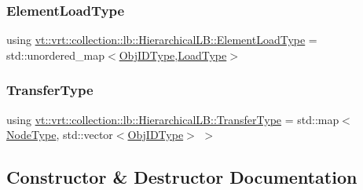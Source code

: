 \subsubsection{\texorpdfstring{Element\+Load\+Type}{ElementLoadType}}
{\footnotesize\ttfamily using \hyperlink{structvt_1_1vrt_1_1collection_1_1lb_1_1_hierarchical_l_b_a6ef136674a2f2709b91ebaade73eff68}{vt\+::vrt\+::collection\+::lb\+::\+Hierarchical\+L\+B\+::\+Element\+Load\+Type} =  std\+::unordered\+\_\+map$<$\hyperlink{structvt_1_1vrt_1_1collection_1_1lb_1_1_base_l_b_a790b22acf448880599724749cdc4e9b3}{Obj\+I\+D\+Type},\hyperlink{namespacevt_a8fb51741340b87d7aaee0bef60e9896b}{Load\+Type}$>$}

\mbox{\label{structvt_1_1vrt_1_1collection_1_1lb_1_1_hierarchical_l_b_a83550b541c35c8a1cc0c97779d1c8184}} 
\subsubsection{\texorpdfstring{Transfer\+Type}{TransferType}}
{\footnotesize\ttfamily using \hyperlink{structvt_1_1vrt_1_1collection_1_1lb_1_1_hierarchical_l_b_a83550b541c35c8a1cc0c97779d1c8184}{vt\+::vrt\+::collection\+::lb\+::\+Hierarchical\+L\+B\+::\+Transfer\+Type} =  std\+::map$<$\hyperlink{namespacevt_a866da9d0efc19c0a1ce79e9e492f47e2}{Node\+Type}, std\+::vector$<$\hyperlink{structvt_1_1vrt_1_1collection_1_1lb_1_1_base_l_b_a790b22acf448880599724749cdc4e9b3}{Obj\+I\+D\+Type}$>$ $>$}



\subsection{Constructor \& Destructor Documentation}
\mbox{\label{structvt_1_1vrt_1_1collection_1_1lb_1_1_hierarchical_l_b_ac654b0d8eca15063f5138ec56ebb2bbb}} 
